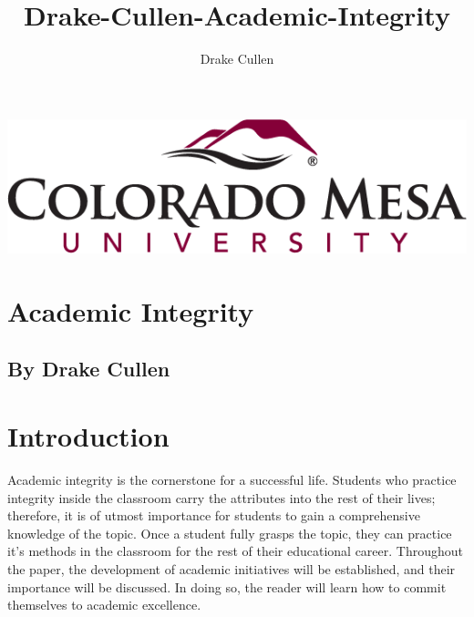 \documentclass[11pt]{article}
\title{Drake-Cullen-Academic-Integrity}
\author{Drake Cullen}
\begin{document}
\begin{minipage}{\linewidth}%
\centering
\includegraphics[keepaspectratio=true,scale=0.35]{CMU.png}
\end{minipage}
\section*{ \centering Academic Integrity}
\subsection*{ \centering By Drake Cullen} 

\vspace{5mm}
 
\tableofcontents

\clearpage

\section{Introduction}
Academic integrity is the cornerstone for a successful life. Students who practice integrity inside the classroom carry the attributes into the rest of their lives; therefore, it is of utmost importance for students to gain a comprehensive knowledge of the topic. Once a student fully grasps the topic, they can practice it's methods in the classroom for the rest of their educational career. Throughout the paper, the development of academic initiatives will be established, and their importance will be discussed. In doing so, the reader will learn how to commit themselves to academic excellence. 
\end{document}

